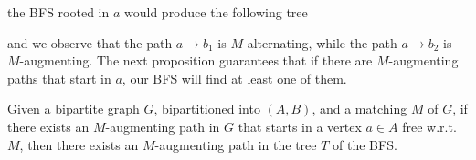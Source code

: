\documentclass[a4paper, 12pt]{report}
\begin{document}
    the  BFS rooted in $a$ would produce the following tree 

    \begin{figure}[H]
        \centering
    \end{figure}

    and we observe that the path $a \to b_1$ is $M$-alternating, while the path $a \to b_2$ is $M$-augmenting. The next proposition guarantees that if there are $M$-augmenting paths that start in $a$, our  BFS will find at least one of them.

    \begin{framedprop}{}
        Given a bipartite graph $G$, bipartitioned into $(A, B)$, and a matching $M$ of $G$, if there exists an $M$-augmenting path in $G$ that starts in a vertex $a \in A$ free w.r.t. $M$, then there exists an $M$-augmenting path in the tree $T$ of the  BFS.
    \end{framedprop}
\end{document}
